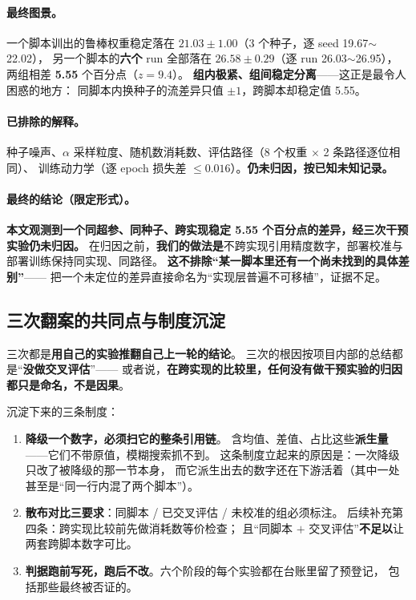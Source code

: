 \documentclass[11pt,a4paper]{ctexart}
\begin{document}
\paragraph{最终图景。}
一个脚本训出的鲁棒权重稳定落在 $\mathbf{21.03\pm1.00}$（3 个种子，逐 seed 19.67$\sim$22.02），
另一个脚本的\textbf{六个} run 全部落在 $\mathbf{26.58\pm0.29}$（逐 run 26.03$\sim$26.95），
两组相差 \textbf{5.55} 个百分点（$z=9.4$）。
\textbf{组内极紧、组间稳定分离}——这正是最令人困惑的地方：
同脚本内换种子的流差异只值 $\pm1$，跨脚本却稳定值 5.55。

\paragraph{已排除的解释。}
种子噪声、$\alpha$ 采样粒度、随机数消耗数、评估路径（8 个权重 $\times$ 2 条路径逐位相同）、
训练动力学（逐 epoch 损失差 $\le0.016$）。\textbf{仍未归因，按已知未知记录。}

\paragraph{最终的结论（限定形式）。}
\textbf{本文观测到一个同超参、同种子、跨实现稳定 5.55 个百分点的差异，经三次干预实验仍未归因。}
在归因之前，\textbf{我们的做法是}不跨实现引用精度数字，部署校准与部署训练保持同实现、同路径。
\textbf{这不排除“某一脚本里还有一个尚未找到的具体差别”}——
把一个未定位的差异直接命名为“实现层普遍不可移植”，证据不足。

\subsection{三次翻案的共同点与制度沉淀}

三次都是\textbf{用自己的实验推翻自己上一轮的结论}。
三次的根因按项目内部的总结都是“\textbf{没做交叉评估}”——
或者说，\textbf{在跨实现的比较里，任何没有做干预实验的归因都只是命名，不是因果}。

沉淀下来的三条制度：

\begin{enumerate}[leftmargin=2em,itemsep=2pt]
  \item \textbf{降级一个数字，必须扫它的整条引用链}。
        含均值、差值、占比这些\textbf{派生量}——它们不带原值，模糊搜索抓不到。
        这条制度立起来的原因是：一次降级只改了被降级的那一节本身，
        而它派生出去的数字还在下游活着（其中一处甚至是“同一行内混了两个脚本”）。
  \item \textbf{散布对比三要求}：同脚本 / 已交叉评估 / 未校准的组必须标注。
        后续补充第四条：跨实现比较前先做消耗数等价检查；
        且“同脚本 $+$ 交叉评估”\textbf{不足以}让两套跨脚本数字可比。
  \item \textbf{判据跑前写死，跑后不改}。六个阶段的每个实验都在台账里留了预登记，
        包括那些最终被否证的。
\end{enumerate}
\end{document}
